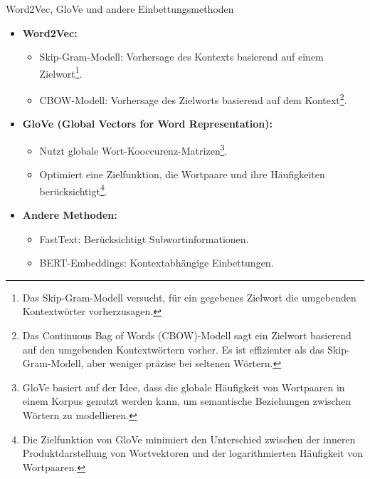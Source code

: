 \documentclass[aspectratio=1610, xcolor=dvipsnames, 9pt]{beamer}
\begin{document}
\begin{frame}{Word2Vec, GloVe und andere Einbettungsmethoden}
  \begin{itemize}
    \item \textbf{Word2Vec:}
      \begin{itemize}
        \item Skip-Gram-Modell: Vorhersage des Kontexts basierend auf einem Zielwort\footnote{Das Skip-Gram-Modell versucht, für ein gegebenes Zielwort die umgebenden Kontextwörter vorherzusagen.}.
        \item CBOW-Modell: Vorhersage des Zielworts basierend auf dem Kontext\footnote{Das Continuous Bag of Words (CBOW)-Modell sagt ein Zielwort basierend auf den umgebenden Kontextwörtern vorher. Es ist effizienter als das Skip-Gram-Modell, aber weniger präzise bei seltenen Wörtern.}.
      \end{itemize}
    \item \textbf{GloVe (Global Vectors for Word Representation):}
      \begin{itemize}
        \item Nutzt globale Wort-Kooccurenz-Matrizen\footnote{GloVe basiert auf der Idee, dass die globale Häufigkeit von Wortpaaren in einem Korpus genutzt werden kann, um semantische Beziehungen zwischen Wörtern zu modellieren.}.
        \item Optimiert eine Zielfunktion, die Wortpaare und ihre Häufigkeiten berücksichtigt\footnote{Die Zielfunktion von GloVe minimiert den Unterschied zwischen der inneren Produktdarstellung von Wortvektoren und der logarithmierten Häufigkeit von Wortpaaren.}.
      \end{itemize}
    \item \textbf{Andere Methoden:}
      \begin{itemize}
        \item FastText: Berücksichtigt Subwortinformationen.
        \item BERT-Embeddings: Kontextabhängige Einbettungen.
      \end{itemize}
  \end{itemize}
\end{frame}
\end{document}
